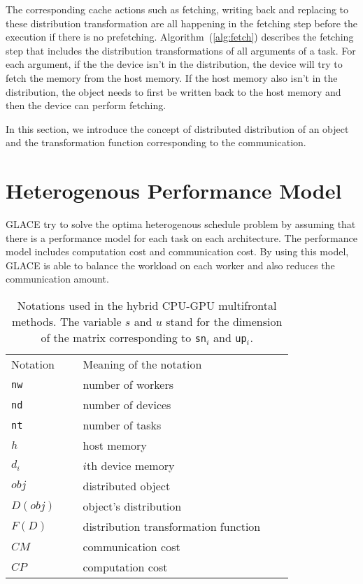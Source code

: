 \documentclass[preprint,11pt]{elsarticle}
\begin{document}
  The corresponding cache actions such as fetching, writing back and replacing to these 
  distribution transformation are all happening in the fetching step before the execution if 
  there is no prefetching. Algorithm~(\ref{alg:fetch}) describes the fetching step that includes the
  distribution transformations of all arguments of a task. For each argument, if the the device
  isn't in the distribution, the device will try to fetch the memory from the host memory.
  If the host memory also isn't in the distribution, the object needs to first be written back to
  the host memory and then the device can perform fetching. 
   
  In this section, we introduce the concept of distributed distribution of an object and the 
  transformation function corresponding to the communication. 
   
    
\section{Heterogenous Performance Model}
  GLACE try to solve the optima heterogenous schedule problem by assuming that there is 
  a performance model for each task on each architecture. The performance model includes
  computation cost and communication cost. By using this model, GLACE is able to balance
  the workload on each worker and also reduces the communication amount.  

\begin{table}
  \centering
  {\footnotesize 
  \begin{tabular}{lllll}
    \hline
    Notation    &\ & Meaning of the notation \\  \cline{1-1}  \cline{3-3}
    {\tt nw}        && number of workers \\
    {\tt nd}         && number of devices \\
    {\tt nt}          && number of tasks \\
    \hline
    {\tt $h$}       && host memory \\
    {\tt $d_i$}    && $i$th device memory \\
    {\tt $obj$}    && distributed object \\
    \hline
    $D(obj)$      && object's distribution \\
    $F(D)$        && distribution transformation function \\
    \hline
    $CM$          && communication cost \\
    $CP$           && computation cost \\
    \hline
  \end{tabular}
}
\caption{Notations used in the hybrid CPU-GPU multifrontal methods.
  The variable $s$ and $u$ stand for the dimension of the matrix corresponding 
  to {\tt sn$_i$} and {\tt up$_i$}.}
  \label{tab:notation}
\end{table}
\end{document}
